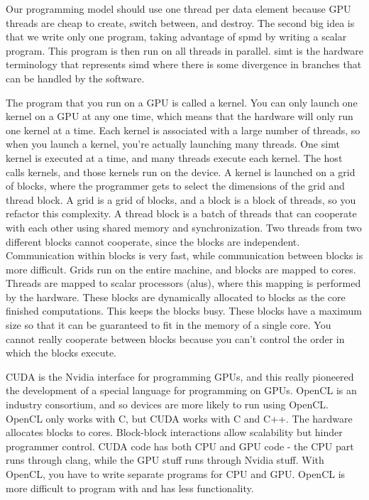 \documentclass[10pt]{article}
\begin{document}
\begin{flushleft}
Our programming model should use one thread per data element because GPU threads are cheap to create, switch between, and destroy. The second big idea is that we write only one program, taking advantage of \gls{spmd} by writing a scalar program. This program is then run on all threads in parallel. \gls{simt} is the hardware terminology that represents \gls{simd} where there is some divergence in branches that can be handled by the software.

The program that you run on a GPU is called a kernel. You can only launch one kernel on a GPU at any one time, which means that the hardware will only run one kernel at a time. Each kernel is associated with a large number of threads, so when you launch a kernel, you're actually launching many threads. One \gls{simt} kernel is executed at a time, and many threads execute each kernel. The host calls kernels, and those kernels run on the device. A kernel is launched on a grid of blocks, where the programmer gets to select the dimensions of the grid and thread block. A grid is a grid of blocks, and a block is a block of threads, so you refactor this complexity. A thread block is a batch of threads that can cooperate with each other using shared memory and synchronization. Two threads from two different blocks cannot cooperate, since the blocks are independent. Communication within blocks is very fast, while communication between blocks is more difficult. Grids run on the entire machine, and blocks are mapped to cores. Threads are mapped to scalar processors (\gls{alu}s), where this mapping is performed by the hardware. These blocks are dynamically allocated to blocks as the core finished computations. This keeps the blocks busy. These blocks have a maximum size so that it can be guaranteed to fit in the memory of a single core. You cannot really cooperate between blocks because you can't control the order in which the blocks execute. 

CUDA is the Nvidia interface for programming GPUs, and this really pioneered the development of a special language for programming on GPUs. OpenCL is an industry consortium, and so devices are more likely to run using OpenCL. OpenCL only works with C, but CUDA works with C and C++. The hardware allocates blocks to cores. Block-block interactions allow scalability but hinder programmer control. CUDA code has both CPU and GPU code - the CPU part runs through clang, while the GPU stuff runs through Nvidia stuff. With OpenCL, you have to write separate programs for CPU and GPU. OpenCL is more difficult to program with and has less functionality. 


\end{flushleft}
\end{document}
